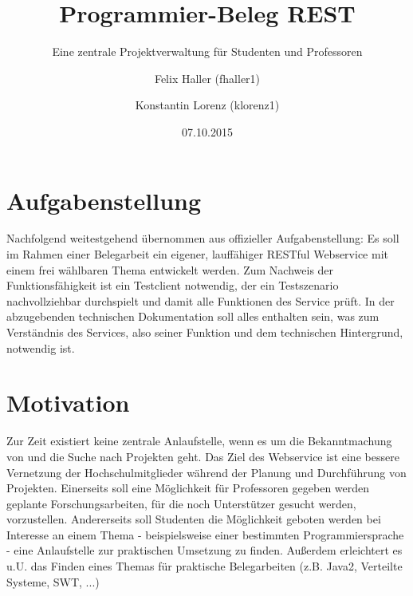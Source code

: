 \documentclass[12pt]{scrartcl}
\begin{document}
	
	
	\subject{Verteilte Systeme}
	\title{Programmier-Beleg REST}
	\subtitle{Eine zentrale Projektverwaltung für Studenten und Professoren}
	\author{Felix Haller (fhaller1) \and Konstantin Lorenz (klorenz1)}
	\date{07.10.2015}
	\publishers{Prüfer: Prof. Dr.-Ing. Andreas Ittner}
	\maketitle
	\thispagestyle{empty} 
	\newpage
	\tableofcontents
	\thispagestyle{empty}
	\newpage	
	\setcounter{page}{1} 
	
	
	
	\section{Aufgabenstellung}
		Nachfolgend weitestgehend übernommen aus offizieller Aufgabenstellung:
		Es soll im Rahmen einer Belegarbeit ein eigener, lauffähiger RESTful Webservice mit einem frei wählbaren Thema entwickelt
		werden. Zum Nachweis der Funktionsfähigkeit ist ein Testclient notwendig, der ein Testszenario nachvollziehbar durchspielt und damit alle Funktionen des Service prüft. In der abzugebenden technischen Dokumentation soll alles enthalten sein, was zum Verständnis des Services, also seiner Funktion und dem technischen Hintergrund, notwendig ist.
		
	\section{Motivation}
		Zur Zeit existiert keine zentrale Anlaufstelle, wenn es um die Bekanntmachung von und die Suche nach Projekten geht. Das Ziel des Webservice ist eine bessere Vernetzung der Hochschulmitglieder während der Planung und Durchführung von Projekten. Einerseits soll eine Möglichkeit für Professoren gegeben werden geplante Forschungsarbeiten, für die noch Unterstützer gesucht werden, vorzustellen. Andererseits soll Studenten die Möglichkeit geboten werden bei Interesse an einem Thema - beispielsweise einer bestimmten Programmiersprache - eine Anlaufstelle zur praktischen Umsetzung zu finden. Außerdem erleichtert es u.U. das Finden eines Themas für praktische Belegarbeiten (z.B. Java2, Verteilte Systeme, SWT, ...)
		
\end{document}
